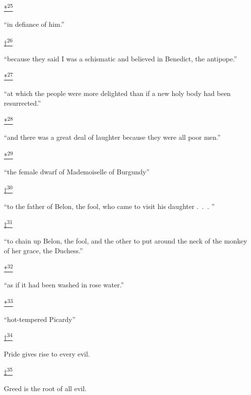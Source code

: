 \protect\hypertarget{23_NOTES.xhtmlux5cux23id_2293}{\protect\hyperlink{08_Chapter_One__THE_PASSIONATE_INTE.xhtmlux5cux23id_2294}{*\textsuperscript{25}}}
``in defiance of him.''

\protect\hypertarget{23_NOTES.xhtmlux5cux23id_2386}{\protect\hyperlink{08_Chapter_One__THE_PASSIONATE_INTE.xhtmlux5cux23id_2385}{†\textsuperscript{26}}}
``because they said I was a schismatic and believed in Benedict, the
antipope.''

\protect\hypertarget{23_NOTES.xhtmlux5cux23id_2388}{\protect\hyperlink{08_Chapter_One__THE_PASSIONATE_INTE.xhtmlux5cux23id_2387}{*\textsuperscript{27}}}
``at which the people were more delighted than if a new holy body had
been resurrected.''

\protect\hypertarget{23_NOTES.xhtmlux5cux23id_2390}{\protect\hyperlink{08_Chapter_One__THE_PASSIONATE_INTE.xhtmlux5cux23id_2389}{*\textsuperscript{28}}}
``and there was a great deal of laughter because they were all poor
men.''

\protect\hypertarget{23_NOTES.xhtmlux5cux23id_2392}{\protect\hyperlink{08_Chapter_One__THE_PASSIONATE_INTE.xhtmlux5cux23id_2391}{*\textsuperscript{29}}}
``the female dwarf of Mademoiselle of Burgundy''

\protect\hypertarget{23_NOTES.xhtmlux5cux23id_2394}{\protect\hyperlink{08_Chapter_One__THE_PASSIONATE_INTE.xhtmlux5cux23id_2393}{†\textsuperscript{30}}}
``to the father of Belon, the fool, who came to visit his daughter .~.~.
''

\protect\hypertarget{23_NOTES.xhtmlux5cux23id_2396}{\protect\hyperlink{08_Chapter_One__THE_PASSIONATE_INTE.xhtmlux5cux23id_2395}{‡\textsuperscript{31}}}
``to chain up Belon, the fool, and the other to put around the neck of
the monkey of her grace, the Duchess.''

\protect\hypertarget{23_NOTES.xhtmlux5cux23id_2398}{\protect\hyperlink{08_Chapter_One__THE_PASSIONATE_INTE.xhtmlux5cux23id_2397}{*\textsuperscript{32}}}
``as if it had been washed in rose water.''

\protect\hypertarget{23_NOTES.xhtmlux5cux23id_2400}{\protect\hyperlink{08_Chapter_One__THE_PASSIONATE_INTE.xhtmlux5cux23id_2399}{*\textsuperscript{33}}}
``hot-tempered Picardy''

\protect\hypertarget{23_NOTES.xhtmlux5cux23id_2402}{\protect\hyperlink{08_Chapter_One__THE_PASSIONATE_INTE.xhtmlux5cux23id_2401}{†\textsuperscript{34}}}
Pride gives rise to every evil.

\protect\hypertarget{23_NOTES.xhtmlux5cux23id_2404}{\protect\hyperlink{08_Chapter_One__THE_PASSIONATE_INTE.xhtmlux5cux23id_2403}{‡\textsuperscript{35}}}
Greed is the root of all evil.

